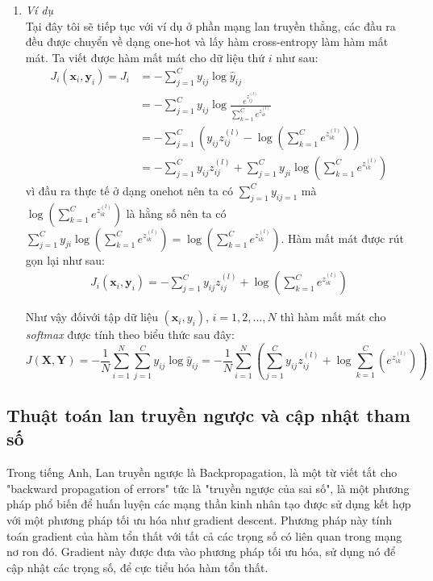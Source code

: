\begin{enumerate}
\item \textit{Ví dụ}\\
Tại đây tôi sẽ tiếp tục với ví dụ ở phần mạng lan truyền thẳng, các đầu ra đều được chuyển về dạng one-hot và lấy hàm cross-entropy làm hàm mất mát. Ta viết được hàm mất mát cho dữ liệu thứ $i$ như sau:
\begin{equation*}
\begin{split}
J_i(\textbf{x}_i,\textbf{y}_i)=J_i &=-\sum_{j=1}^C y_{ij} \log \widehat{y}_{ij}	\\
&= -\sum_{j = 1}^C y_{ij}\log\frac{e^{z^{(l)}_{ij}}}{\sum_{k=1}^C e^{z^{(l)}_{ik}}}\\
&= -\sum_{j=1}^C\left(y_{ij} z^{(l)}_{ij}-\log(\sum_{k=1}^C e^{z^{(l)}_{ik}})\right) \\
&= -\sum_{j=1}^C y_{ij} z^{(l)}_{ij} + \sum_{j=1}^C y_{ji}\log(\sum_{k=1}^C e^{z^{(l)}_{ik}}) 
\end{split}
\end{equation*}
vì đầu ra thực tế ở dạng onehot nên ta có  $\sum_{j=1}^C y_{ij = 1}$ mà $\log(\sum_{k=1}^C e^{z^{(l)}_{ik}})$ là hằng số nên ta có $ \sum_{j=1}^C y_{ji}\log(\sum_{k=1}^C e^{z^{(l)}_{ik}}) = \log(\sum_{k=1}^C e^{z^{(l)}_{ik}})$. Hàm mất mát được rút gọn lại như sau:
\begin{align}
\label{eq:cost1}
J_i(\textbf{x}_i,\textbf{y}_i) = -\sum_{j=1}^C y_{ij} z^{(l)}_{ij} +\log(\sum_{k=1}^C e^{z^{(l)}_{ik}})
\end{align}
\par

Như vậy đốivới tập dữ liệu $(\textbf{x}_i,y_i)$, $i=1,2,...,N$ thì hàm mất mát cho \textit{softmax} được tính theo biểu thức sau đây:
\begin{equation}
\label{eq:cost2}
J(\textbf{X},\textbf{Y})
= -\frac{1}{N}\sum_{i=1}^{N}\sum_{j=1}^C y_{ij} \log \widehat{y}_{ij}
=-\frac{1}{N} \sum_{i=1}^N \left(  \sum_{j=1}^C y_{ij}z^{(l)}_{ij} + \log\sum_{k=1}^C (e^{z^{(l)}_{ik}}) \right)
\end{equation} 
\end{enumerate}

\subsection{Thuật toán lan truyền ngược và cập nhật tham số}
Trong tiếng Anh, Lan truyền ngược là Backpropagation, là một từ viết tắt cho "backward propagation of errors" tức là "truyền ngược của sai số", là một phương pháp phổ biến để huấn luyện các mạng thần kinh nhân tạo được sử dụng kết hợp với một phương pháp tối ưu hóa như gradient descent. Phương pháp này tính toán gradient của hàm tổn thất với tất cả các trọng số có liên quan trong mạng nơ ron đó. Gradient này được đưa vào phương pháp tối ưu hóa, sử dụng nó để cập nhật các trọng số, để cực tiểu hóa hàm tổn thất.

